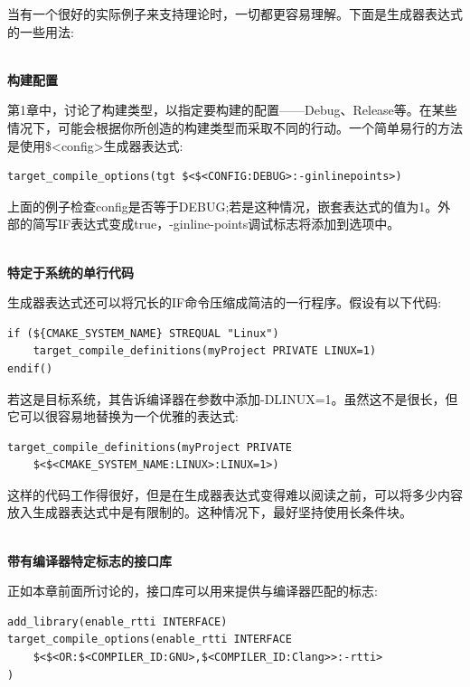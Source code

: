 
当有一个很好的实际例子来支持理论时，一切都更容易理解。下面是生成器表达式的一些用法:

\hspace*{\fill} \\ %
\noindent
\textbf{构建配置}

第1章中，讨论了构建类型，以指定要构建的配置——Debug、Release等。在某些情况下，可能会根据你所创造的构建类型而采取不同的行动。一个简单易行的方法是使用\$<config>生成器表达式:

\begin{lstlisting}[style=styleCMake]
target_compile_options(tgt $<$<CONFIG:DEBUG>:-ginlinepoints>)
\end{lstlisting}

上面的例子检查config是否等于DEBUG;若是这种情况，嵌套表达式的值为1。外部的简写IF表达式变成true，-ginline-points调试标志将添加到选项中。

\hspace*{\fill} \\ %
\noindent
\textbf{特定于系统的单行代码}

生成器表达式还可以将冗长的IF命令压缩成简洁的一行程序。假设有以下代码:

\begin{lstlisting}[style=styleCMake]
if (${CMAKE_SYSTEM_NAME} STREQUAL "Linux")
	target_compile_definitions(myProject PRIVATE LINUX=1)
endif()
\end{lstlisting}

若这是目标系统，其告诉编译器在参数中添加-DLINUX=1。虽然这不是很长，但它可以很容易地替换为一个优雅的表达式:

\begin{lstlisting}[style=styleCMake]
target_compile_definitions(myProject PRIVATE
	$<$<CMAKE_SYSTEM_NAME:LINUX>:LINUX=1>)
\end{lstlisting}

这样的代码工作得很好，但是在生成器表达式变得难以阅读之前，可以将多少内容放入生成器表达式中是有限制的。这种情况下，最好坚持使用长条件块。

\hspace*{\fill} \\ %
\noindent
\textbf{带有编译器特定标志的接口库}

正如本章前面所讨论的，接口库可以用来提供与编译器匹配的标志:

\begin{lstlisting}[style=styleCMake]
add_library(enable_rtti INTERFACE)
target_compile_options(enable_rtti INTERFACE
	$<$<OR:$<COMPILER_ID:GNU>,$<COMPILER_ID:Clang>>:-rtti>
)
\end{lstlisting}


